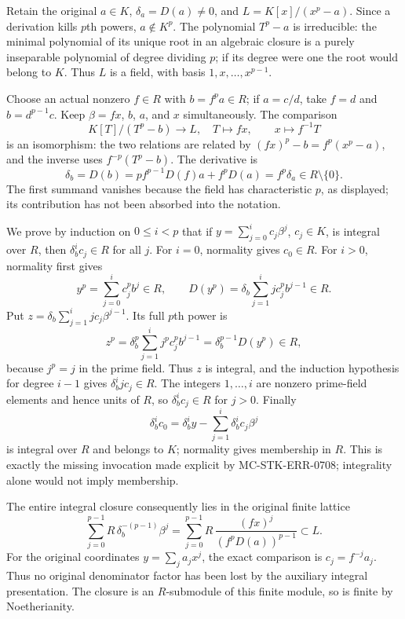 Retain the original \(a\in K\), \(\delta_a=D(a)\ne0\), and \(L=K[x]/(x^p-a)\). Since a derivation kills \(p\)th powers, \(a\notin K^p\). The polynomial \(T^p-a\) is irreducible: the minimal polynomial of its unique root in an algebraic closure is a purely inseparable polynomial of degree dividing \(p\); if its degree were one the root would belong to \(K\). Thus \(L\) is a field, with basis \(1,x,\ldots,x^{p-1}\).

Choose an actual nonzero \(f\in R\) with \(b=f^pa\in R\); if \(a=c/d\), take \(f=d\) and \(b=d^{p-1}c\). Keep \(\beta=fx\), \(b\), \(a\), and \(x\) simultaneously. The comparison \[
 K[T]/(T^p-b)\longrightarrow L,\quad T\longmapsto fx,
 \qquad x\longmapsto f^{-1}T
\] is an isomorphism: the two relations are related by \((fx)^p-b=f^p(x^p-a)\), and the inverse uses \(f^{-p}(T^p-b)\). The derivative is \[
 \delta_b=D(b)=p f^{p-1}D(f)a+f^pD(a)=f^p\delta_a\in R\setminus\{0\}.
\] The first summand vanishes because the field has characteristic \(p\), as displayed; its contribution has not been absorbed into the notation.

We prove by induction on \(0\leq i<p\) that if \(y=\sum_{j=0}^{i}c_j\beta^j\), \(c_j\in K\), is integral over \(R\), then \(\delta_b^i c_j\in R\) for all \(j\). For \(i=0\), normality gives \(c_0\in R\). For \(i>0\), normality first gives \[
 y^p=\sum_{j=0}^{i}c_j^p b^j\in R,
 \qquad
 D(y^p)=\delta_b\sum_{j=1}^{i}j c_j^p b^{j-1}\in R.
\] Put \(z=\delta_b\sum_{j=1}^{i}j c_j\beta^{j-1}\). Its full \(p\)th power is \[
 z^p=\delta_b^p\sum_{j=1}^{i}j^p c_j^p b^{j-1}
     =\delta_b^{p-1}D(y^p)\in R,
\] because \(j^p=j\) in the prime field. Thus \(z\) is integral, and the induction hypothesis for degree \(i-1\) gives \(\delta_b^i j c_j\in R\). The integers \(1,\ldots,i\) are nonzero prime-field elements and hence units of \(R\), so \(\delta_b^i c_j\in R\) for \(j>0\). Finally \[
 \delta_b^i c_0=\delta_b^i y-\sum_{j=1}^{i}\delta_b^i c_j\beta^j
\] is integral over \(R\) and belongs to \(K\); normality gives membership in \(R\). This is exactly the missing invocation made explicit by MC-STK-ERR-0708; integrality alone would not imply membership.

The entire integral closure consequently lies in the original finite lattice \[
 \sum_{j=0}^{p-1}R\,\delta_b^{-(p-1)}\beta^j
 =\sum_{j=0}^{p-1}R\,\frac{(fx)^j}{(f^pD(a))^{p-1}}\subset L.
\] For the original coordinates \(y=\sum_j a_jx^j\), the exact comparison is \(c_j=f^{-j}a_j\). Thus no original denominator factor has been lost by the auxiliary integral presentation. The closure is an \(R\)-submodule of this finite module, so is finite by Noetherianity.

